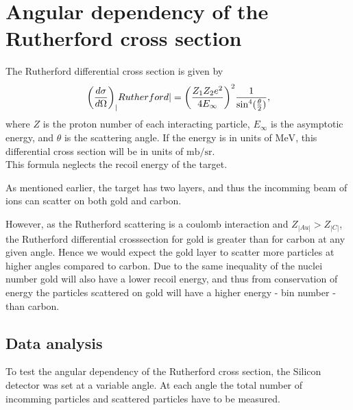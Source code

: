 \section{Angular dependency of the Rutherford cross section}
The Rutherford differential cross section \parencite[p. 16]{noteBB} is given by
\begin{align}\label{eq:cross}
    {\left( \diff[d]{\sigma}{\Omega} \right)}_|Rutherford| =
    {\left(\frac{Z_1Z_2 e^2}{4E_{\infty}} \right)}^2
    \frac{1}{{{\sin}^4(\frac{\theta}{2})}},
\end{align}
where $Z$ is the proton number of each interacting particle, $E_{\infty}$ is
the asymptotic energy, and $\theta$ is the scattering angle. If the energy is
in units of $\si{\mega\electronvolt}$, this differential cross section will be in units
of $\si{\milli\barn\per\steradian}$.\\
This formula neglects the recoil energy of the target. 

As mentioned earlier, the target has two layers, and thus the incomming beam of
ions can scatter on both gold and carbon. 

However, as the Rutherford scattering is a coulomb interaction and $Z_|Au| > Z_|C|$, the Rutherford differential crosssection for gold is greater than for carbon at any given angle. Hence we would expect the gold layer to scatter more particles at higher angles compared to carbon. Due to the same inequality of the nuclei number gold will also have a lower recoil energy, and thus from conservation of energy the particles scattered on gold will have a higher energy - bin number - than carbon.



\subsection{Data analysis}
To test the angular dependency of the Rutherford cross section, the Silicon detector was set at a variable angle. At each angle the total number of incomming particles and scattered particles have to be measured.\\

